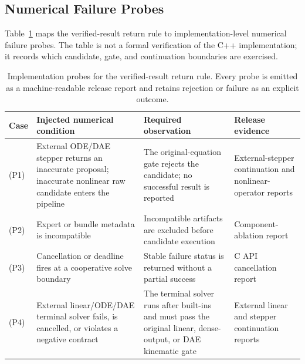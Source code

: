 \subsection{Numerical Failure Probes}

Table~\ref{tab:acceptance-probes} maps the verified-result return rule to
implementation-level numerical failure probes. The table is not a formal verification
of the C++ implementation; it records which candidate, gate, and continuation boundaries
are exercised.

\begin{table}[t]
\centering
\caption{Implementation probes for the verified-result return rule. Every probe
is emitted as a machine-readable release report and retains rejection or failure as
an explicit outcome.}
\label{tab:acceptance-probes}
\begin{tabular}{p{1.0cm}p{4.0cm}p{5.0cm}p{4.8cm}}
\toprule
Case & Injected numerical condition & Required observation & Release evidence \\
\midrule
(P1) & External ODE/DAE stepper returns an inaccurate proposal; inaccurate
nonlinear raw candidate enters the pipeline & The original-equation gate rejects the
candidate; no successful result is reported & External-stepper continuation and nonlinear-operator
reports \\
(P2) & Expert or bundle metadata is incompatible
& Incompatible artifacts are excluded before candidate execution
& Component-ablation report \\
(P3) & Cancellation or deadline fires at a cooperative solve boundary
& Stable failure status is returned without a partial success
& C API cancellation report \\
(P4) & External linear/ODE/DAE terminal solver fails, is cancelled, or violates a negative
contract & The terminal solver runs after built-ins and must pass the original linear,
dense-output, or DAE kinematic gate & External linear and stepper continuation reports \\
\bottomrule
\end{tabular}
\end{table}
